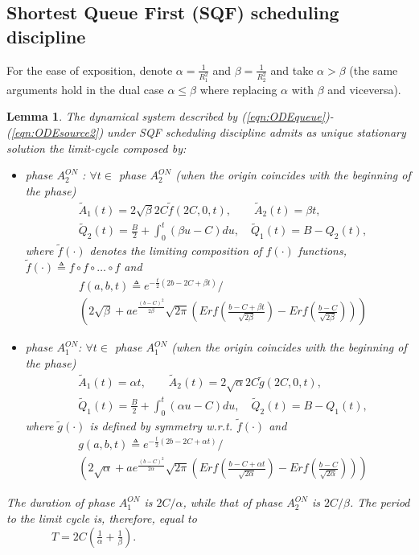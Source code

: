 \documentclass[a4paper,oneside, 11pt]{article}
\newtheorem{lem}[theorem]{Lemma}
\begin{document}
\subsection{Shortest Queue First (SQF) scheduling discipline}\label{sec:SQF}
For the ease of exposition, denote $\alpha=\frac{1}{R_1^2}$ and $\beta=\frac{1}{R_2^2}$ and take $\alpha > \beta$ (the same arguments hold in the dual case $\alpha \le \beta$ where replacing $\alpha$ with $\beta$ and viceversa).
\begin{lem}
 The dynamical system described by (\ref{eqn:ODEqueue})-(\ref{eqn:ODEsource2}) under SQF scheduling discipline admits as unique stationary solution the limit-cycle composed by:\begin{itemize}
 \item \textit{phase $A_2^{ON}$ }:
 $\forall t \in$ phase $A_2^{ON}$ (when  the origin coincides with the beginning of the phase)
\begin{align*}
&\widetilde{A}_1(t)= 2\sqrt{\beta}2C\widetilde{f}(2C,0,t), \qquad\widetilde{A}_2(t)=\beta t, \nonumber \\
&\widetilde{Q}_2(t)=\frac{B}{2}+\int_{0}^t (\beta u -C)du,\quad\widetilde{Q}_1(t)=B-Q_2(t),
\end{align*}
where $\widetilde{f}(\cdot)$ denotes the limiting composition of $f(\cdot)$ functions,
$\widetilde{f}(\cdot) \triangleq f\circ f \circ \dots \circ f
$ and
\begin{align}\label{def:f}
&f(a,b,t)\triangleq e^{-\frac{t}{2}(2b-2C+\beta t)}/ \\
&\left(2\sqrt{\beta}+a e^{\frac{(b-C)^2}{2\beta}}\sqrt{2\pi}\left(Erf\left(\frac{b-C+\beta t}{\sqrt{2\beta}}\right)-Erf\left(\frac{b-C}{\sqrt{2\beta}}\right)\right)\right) \nonumber
\end{align}
 \item \textit{phase $A_1^{ON}$}:
 $\forall t \in$ phase $A_1^{ON}$ (when  the origin coincides with the beginning of the phase)
\begin{align*}
&\widetilde{A}_1(t)= \alpha t, \qquad\widetilde{A}_2(t)=2\sqrt{\alpha}2C \widetilde{g}(2C,0,t), \nonumber \\
&\widetilde{Q}_1(t)=\frac{B}{2}+\int_{0}^t (\alpha u -C)du, \quad\widetilde{Q}_2(t)=B-Q_1(t),
\end{align*}
where $\widetilde{g}(\cdot)$ is defined by symmetry w.r.t. $\widetilde{f}(\cdot)$ and
\begin{align}\label{def:g}
&g(a,b,t)\triangleq e^{-\frac{t}{2}(2b-2C+\alpha t)}/  \\&\left(2\sqrt{\alpha}+a e^{\frac{(b-C)^2}{2\alpha}}\sqrt{2\pi}\left(Erf\left(\frac{b-C+\alpha t}{\sqrt{2\alpha}}\right)-Erf\left(\frac{b-C}{\sqrt{2\alpha}}\right)\right)\right) \nonumber
\end{align}
\end{itemize}
The duration of phase $A_1^{ON}$ is $2C/\alpha$, while that of phase $A_2^{ON}$ is $2C/\beta$.
The period to the limit cycle is, therefore, equal to\\
$\qquad\qquad T=2C\left( \frac{1}{\alpha}+\frac{1}{\beta}\right).$
\end{lem}
\end{document}
